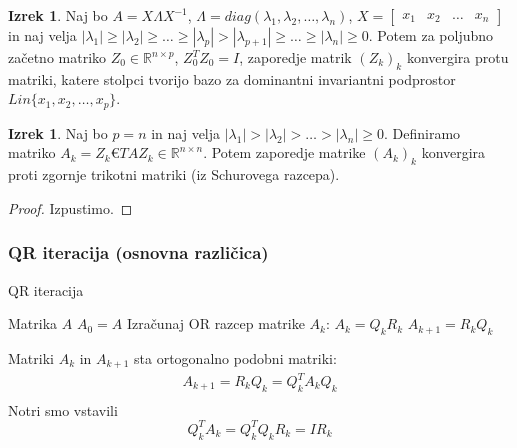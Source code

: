 \documentclass[a4paper,12pt]{article}
\theoremstyle{definition}
\newtheorem{theorem}[counter]{Izrek}
\theoremstyle{remark}
\newcommand{\R}{\mathbb{R}}
\begin{document}
\begin{theorem}
    Naj bo $A = X \Lambda X^{-1}$, $\Lambda = diag(\lambda_1, \lambda_2, \dots, \lambda_n)$, $X = \begin{bmatrix}
        x_1 & x_2 & \dots & x_n
    \end{bmatrix}$ in naj velja $|\lambda_1| \geq |\lambda_2| \geq \dots \geq |\lambda_p| > |\lambda_{p+1}| \geq \dots \geq |\lambda_n| \geq 0$.
    Potem za poljubno začetno matriko $Z_0 \in \R^{n \times p}$, $Z_0^T Z_0 = I$, zaporedje matrik $(Z_k)_k$ konvergira protu matriki,
    katere stolpci tvorijo bazo za dominantni invariantni podprostor $Lin\{x_1, x_2, \dots, x_p\}$.
\end{theorem}

\begin{theorem}
    Naj bo $p = n$ in naj velja $| \lambda_1 | > | \lambda_2 | > \dots > | \lambda_n | \geq 0$. Definiramo matriko $A_k = Z_k€T A Z_k \in \R^{n \times n}$.
    Potem zaporedje matrike $(A_k)_k$ konvergira proti zgornje trikotni matriki (iz Schurovega razcepa).
\end{theorem}

\begin{proof}
    Izpustimo.
\end{proof}


\subsubsection{QR iteracija (osnovna različica)}




\begin{algorithm}
\caption{QR iteracija}
\begin{algorithmic}[1]
\Require Matrika $A$
\State $A_0 = A$
    \State Izračunaj OR razcep matrike $A_k$: $A_k = Q_k R_k$
    \State $A_{k+1} = R_k Q_k$
\EndWhile
\end{algorithmic}
\end{algorithm}



Matriki $A_k$ in $A_{k+1}$ sta ortogonalno podobni matriki:
\begin{gather*}
    A_{k+1} = R_k Q_k = Q_k^T A_k Q_k\\
\end{gather*}
Notri smo vstavili
\begin{equation*}
    Q_k^T A_k = Q_k^T Q_k R_k = I R_k
\end{equation*}
\end{document}
